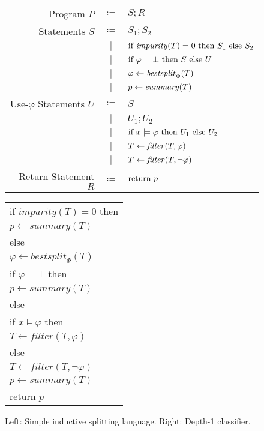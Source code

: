\begin{figure}
\begin{minipage}{0.65\textwidth}
\centering
\begin{tabular}{rcl}
Program $P$ & $\coloneqq$ & $S ; R$ \\
Statements $S$ & $\coloneqq$ & $S_1 ; S_2$ \\
& $\mid$ & $\iteimpuritynode{S_1}{S_2}$ \\
& $\mid$ & $\itetrivialnode{S}{U}$ \\
& $\mid$ & $\bestsplitnode$ \\
& $\mid$ & $\summarynode$ \\
Use-$\varphi$ Statements $U$ & $\coloneqq$ & $S$ \\
& $\mid$ & $U_1 ; U_2$ \\
& $\mid$ & $\itemodelsnode{U_1}{U_2}$ \\
& $\mid$ & $\filternode$ \\
& $\mid$ & $\filternode[\lnot]$ \\
Return Statement $R$ & $\coloneqq$ & $\returnnode$ \\
\end{tabular}
\end{minipage}
%
\begin{minipage}{0.3\textwidth}
\centering
\begin{tabular}{l}
if $\mathit{impurity}(T) = 0$ then \\
\quad $p \gets \mathit{summary}(T)$ \\
else \\
\quad $\varphi \gets \mathit{bestsplit}_\Phi(T)$ \\
\quad if $\varphi = \bot$ then \\
\qquad $p \gets \mathit{summary}(T)$ \\
\quad else \\
\qquad if $x \models \varphi$ then \\
\qquad\quad $T \gets \mathit{filter}(T, \varphi)$ \\
\qquad else \\
\qquad\quad $T \gets \mathit{filter}(T, \lnot\varphi)$ \\
\qquad $p \gets \mathit{summary}(T)$ \\
return $p$
\end{tabular}
\end{minipage}
\caption{Left: Simple inductive splitting language.
Right: Depth-1 classifier.}
\label{fig:dsl}
\end{figure}

